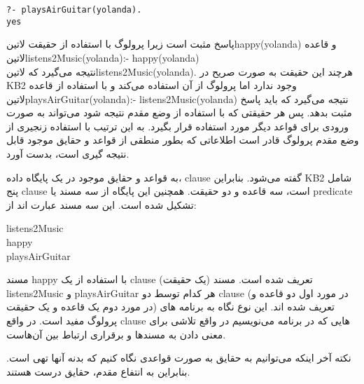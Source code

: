 \begin{latin}
\begin{lstlisting}
?- playsAirGuitar(yolanda).
yes
\end{lstlisting}
\end{latin}

پاسخ مثبت است زیرا پرولوگ با استفاده از حقیقت ‌لاتین{happy(yolanda)} و قاعده \\
 ‌لاتین{listens2Music(yolanda):-  happy(yolanda)} \\
نتیجه می‌گیرد که ‌لاتین{listens2Music(yolanda)}. هرچند این حقیقت به صورت صریح در KB2 وجود ندارد اما پرولوگ از آن استفاده می‌کند و با استفاده از قاعده ‌لاتین{playsAirGuitar(yolanda):-  listens2Music(yolanda)}  نتیجه می‌گیرد که باید پاسخ مثبت بدهد. پس هر حقیقتی که با استفاده از وضع مقدم نتیجه شود می‌تواند به صورت ورودی برای قواعد دیگر مورد استفاده قرار بگیرد. به این ترتیب با استفاده زنجیری از وضع مقدم پرولوگ قادر است اطلاعاتی که بطور منطقی از قواعد و حقایق موجود قابل نتیجه گیری است، بدست آورد.

به قواعد و حقایق موجود در یک پایگاه داده، clause گفته می‌شود. بنابراین KB2 شامل پنج clause است، سه قاعده و دو حقیقت. همچنین این پایگاه از سه مسند یا predicate تشکیل شده است. این سه مسند عبارت اند از:

\begin{latin}
listens2Music \\
happy \\
playsAirGuitar \\
\end{latin}

مسند happy با استفاده از یک clause (یک حقیقت) تعریف شده است. مسند listens2Music و playsAirGuitar هر کدام توسط دو clause (در مورد اول دو قاعده و در مورد دوم یک قاعده و یک حقیقت) تعریف شده اند. این نوع نگاه به برنامه های پرولوگ مفید است. در واقع clause هایی که در برنامه می‌نویسیم در واقع تلاشی برای معنی دادن به مسندها و برقراری ارتباط بین آن‌هاست.

نکته آخر اینکه می‌توانیم به حقایق به صورت قواعدی نگاه کنیم که بدنه آنها تهی است. بنابراین به انتفاع مقدم، حقایق درست هستند.

\subsection{}
